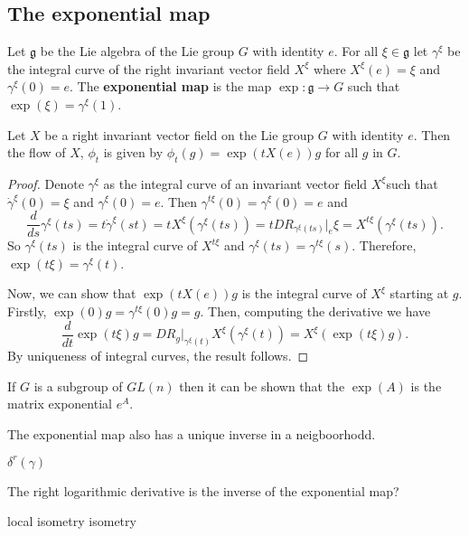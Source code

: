 \subsection{The exponential map}

\begin{definition}
  Let  \(\mathfrak{g}\) be the Lie algebra of the Lie group  \(G\) with identity  \(e\). For all  \(\xi \in \mathfrak{g}\) let  \(\gamma^{\xi}\) be the integral curve of the right invariant vector field  \(X^{\xi}\) where  \(X^\xi (e)=\xi\) and  \(\gamma^\xi(0) = e\). The \textbf{exponential map} is the map  \(\exp : \mathfrak{g} \rightarrow G\) such that  \(\exp(\xi) = \gamma^\xi(1)\).
\end{definition}
\begin{proposition}
  Let  \(X\) be a right invariant vector field on the Lie group  \(G\) with identity  \(e\). Then the flow of  \(X\),  \(\phi_t\) is given by  \(\phi_t(g) = \exp(tX(e))g\) for all  \(g\) in  \(G\).
\end{proposition}
\begin{proof}
  Denote  \(\gamma^{\xi}\) as the integral curve of an  invariant vector field  \(X^{\xi}\)such that  \(\dot{\gamma}^{\xi}(0) = \xi \) and  \(\gamma^\xi(0)=e\). Then  \(\gamma^{t\xi}(0) =  \gamma^{\xi}(0)=e\) and
  \begin{equation}
    \frac{d}{ds}\gamma^{\xi}(ts) = t\dot\gamma^{\xi}(st)=tX^\xi(\gamma^{\xi}(ts)) = t D R_{\gamma^\xi(ts)} \vert_{e} \xi = X^{t\xi}(\gamma^{\xi}(ts)).
  \end{equation}
  So  \(\gamma^\xi(ts)\) is the integral curve of  \(X^{t\xi}\) and  \(\gamma^\xi(ts)=\gamma^{t\xi}(s)\). Therefore,   \(\exp(t\xi) = \gamma^{\xi}(t)\).

  Now, we can show that  \(\exp(tX(e))g\) is the integral curve of  \(X^{\xi}\) starting at  \(g\). Firstly,  \(\exp(0)g = \gamma^{t\xi}(0)g=g\). Then, computing the derivative we have
  \begin{equation}
    \frac{d}{dt} \exp(t\xi)g = D R_g \vert_{\gamma^\xi(t)} X^\xi(\gamma^\xi(t)) = X^\xi(\exp(t\xi)g).
  \end{equation}
  By uniqueness of integral curves, the result follows.
\end{proof}
\begin{remark}
  If  \(G\) is a subgroup of  \(GL(n)\) then it can be shown that the  \(\exp(A)\) is the matrix exponential  \(e^{A}\).
\end{remark}


The exponential map also has a unique inverse in a neigboorhodd.
\begin{definition}
  \(\delta^r(\gamma)\)
\end{definition}
\begin{proposition}
  The right logarithmic derivative is the inverse of the exponential map?
\end{proposition}
local isometry
isometry



